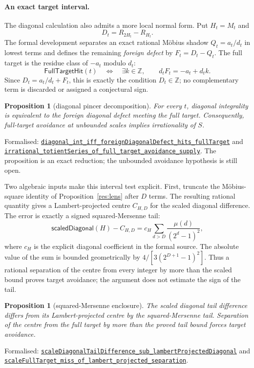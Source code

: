 \documentclass[11pt]{article}
\newcommand{\commit}{81150c1c6fdd4cd51e76d3aa0de344341e0e9e7c}
\newcommand{\repobase}{https://github.com/wcook04/plectis-lean-erdos249-257/blob/\commit}
\newcommand{\PK}{Erdos249257}
\newcommand{\lref}[3]{\href{\repobase/\PK/#1\#L#2}{\nolinkurl{#3}}}
\newtheorem{proposition}[theorem]{Proposition}
\theoremstyle{definition}
\theoremstyle{remark}
\newcommand{\Z}{\mathbb{Z}}
\begin{document}
\paragraph{An exact target interval.} The diagonal calculation also admits a
more local normal form.  Put $H_t=M_t$ and
\[
 D_t=R_{2H_t}-R_{H_t}.
\]
The formal development separates an exact rational M\"obius shadow
$Q_t=a_t/d_t$ in lowest terms and defines the remaining \emph{foreign defect}
by $F_t=D_t-Q_t$.  The full target is the residue class of $-a_t$ modulo $d_t$:
\[
 \textsf{FullTargetHit}(t)
 \quad\Longleftrightarrow\quad
 \exists k\in\Z,\qquad d_tF_t=-a_t+d_tk.
\]
Since $D_t=a_t/d_t+F_t$, this is exactly the condition $D_t\in\Z$; no
complementary term is discarded or assigned a conjectural sign.

\begin{proposition}[diagonal pincer decomposition]\label{res:pincer}
For every $t$, diagonal integrality is equivalent to the foreign diagonal
defect meeting the full target.  Consequently, full-target avoidance at
unbounded scales implies irrationality of $S$.
\end{proposition}
\noindent Formalised:
\lref{DiagonalPincerDecomposition.lean}{215}{diagonal_int_iff_foreignDiagonalDefect_hits_fullTarget}
and
\lref{DiagonalPincerDecomposition.lean}{290}{irrational_totientSeries_of_full_target_avoidance_supply}.
The proposition is an exact reduction; the unbounded avoidance hypothesis is
still open.

Two algebraic inputs make this interval test explicit.  First, truncate the
M\"obius-square identity of Proposition~\ref{res:lens} after $D$ terms.  The
resulting rational quantity gives a Lambert-projected centre $C_{H,D}$ for the
scaled diagonal difference.  The error is exactly a signed squared-Mersenne
tail:
\[
 \textsf{scaledDiagonal}(H)-C_{H,D}
   =c_H\sum_{d>D}\frac{\mu(d)}{(2^d-1)^2},
\]
where $c_H$ is the explicit diagonal coefficient in the formal source.  The
absolute value of the sum is bounded geometrically by
$4/[3(2^{D+1}-1)^2]$.  Thus a rational separation of the centre from every
integer by more than the scaled bound proves target avoidance; the argument
does not estimate the sign of the tail.

\begin{proposition}[squared-Mersenne enclosure]\label{res:squareenclosure}
The scaled diagonal tail difference differs from its Lambert-projected centre
by the squared-Mersenne tail.  Separation of the centre from the full target by
more than the proved tail bound forces target avoidance.
\end{proposition}
\noindent Formalised:
\lref{SquaredMersenneDiagonalEnclosure.lean}{116}{scaleDiagonalTailDifference_sub_lambertProjectedDiagonal}
and
\lref{SquaredMersenneDiagonalEnclosure.lean}{237}{scaleFullTarget_miss_of_lambert_projected_separation}.
\end{document}
